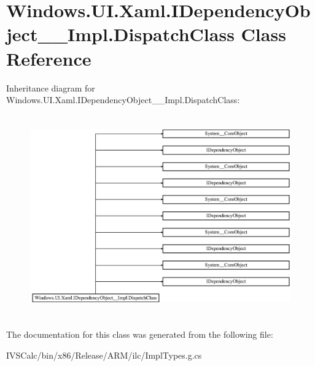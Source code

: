 \hypertarget{class_windows_1_1_u_i_1_1_xaml_1_1_i_dependency_object_____impl_1_1_dispatch_class}{}\section{Windows.\+U\+I.\+Xaml.\+I\+Dependency\+Object\+\_\+\+\_\+\+Impl.\+Dispatch\+Class Class Reference}
\label{class_windows_1_1_u_i_1_1_xaml_1_1_i_dependency_object_____impl_1_1_dispatch_class}
Inheritance diagram for Windows.\+U\+I.\+Xaml.\+I\+Dependency\+Object\+\_\+\+\_\+\+Impl.\+Dispatch\+Class\+:\begin{figure}[H]
\begin{center}
\leavevmode
\includegraphics[height=8.725213cm]{class_windows_1_1_u_i_1_1_xaml_1_1_i_dependency_object_____impl_1_1_dispatch_class}
\end{center}
\end{figure}


The documentation for this class was generated from the following file\+:\begin{DoxyCompactItemize}
\item 
I\+V\+S\+Calc/bin/x86/\+Release/\+A\+R\+M/ilc/Impl\+Types.\+g.\+cs\end{DoxyCompactItemize}
